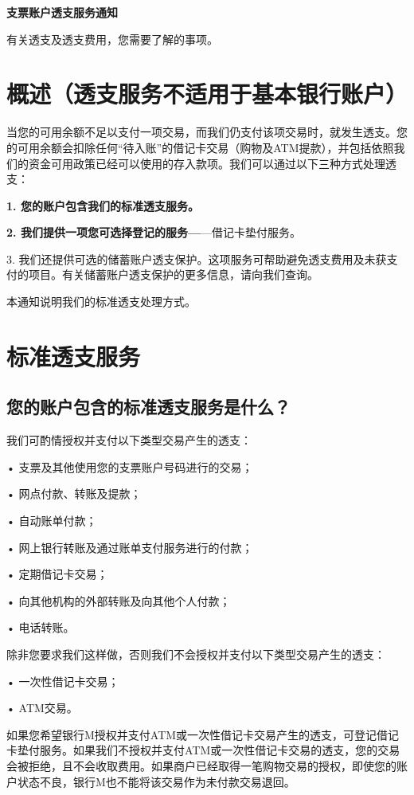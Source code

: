 \documentclass[UTF8,fontset=none,11pt,a4paper]{ctexart}
\begin{document}
{\noindent\fontsize{20}{25}\selectfont\bfseries 支票账户透支服务通知\par}
\vspace{10pt}
有关透支及透支费用，您需要了解的事项。


\section*{概述（透支服务不适用于基本银行账户）}
当您的可用余额不足以支付一项交易，而我们仍支付该项交易时，就发生透支。您的可用余额会扣除任何“待入账”的借记卡交易（购物及ATM提款），并包括依照我们的资金可用政策已经可以使用的存入款项。我们可以通过以下三种方式处理透支：


\textbf{1. 您的账户包含我们的标准透支服务。}


\textbf{2. 我们提供一项您可选择登记的服务—}—借记卡垫付服务。


3. 我们还提供可选的储蓄账户透支保护。这项服务可帮助避免透支费用及未获支付的项目。有关储蓄账户透支保护的更多信息，请向我们查询。


本通知说明我们的标准透支处理方式。


\section*{标准透支服务}
\subsection*{您的账户包含的标准透支服务是什么？}
我们可酌情授权并支付以下类型交易产生的透支：


• 支票及其他使用您的支票账户号码进行的交易；


• 网点付款、转账及提款；


• 自动账单付款；


• 网上银行转账及通过账单支付服务进行的付款；


• 定期借记卡交易；


• 向其他机构的外部转账及向其他个人付款；


• 电话转账。


除非您要求我们这样做，否则我们不会授权并支付以下类型交易产生的透支：


• 一次性借记卡交易；


• ATM交易。


如果您希望银行M授权并支付ATM或一次性借记卡交易产生的透支，可登记借记卡垫付服务。如果我们不授权并支付ATM或一次性借记卡交易的透支，您的交易会被拒绝，且不会收取费用。如果商户已经取得一笔购物交易的授权，即使您的账户状态不良，银行M也不能将该交易作为未付款交易退回。
\end{document}
